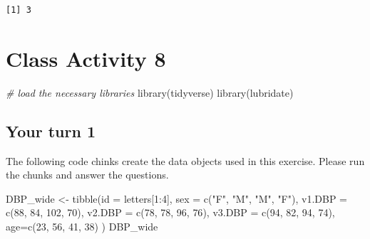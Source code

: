 \documentclass[
]{book}
\newenvironment{Shaded}{\begin{snugshade}}{\end{snugshade}}
\newcommand{\AttributeTok}[1]{\textcolor[rgb]{0.77,0.63,0.00}{#1}}
\newcommand{\CommentTok}[1]{\textcolor[rgb]{0.56,0.35,0.01}{\textit{#1}}}
\newcommand{\DecValTok}[1]{\textcolor[rgb]{0.00,0.00,0.81}{#1}}
\newcommand{\FunctionTok}[1]{\textcolor[rgb]{0.00,0.00,0.00}{#1}}
\newcommand{\NormalTok}[1]{#1}
\newcommand{\OtherTok}[1]{\textcolor[rgb]{0.56,0.35,0.01}{#1}}
\newcommand{\SpecialCharTok}[1]{\textcolor[rgb]{0.00,0.00,0.00}{#1}}
\newcommand{\StringTok}[1]{\textcolor[rgb]{0.31,0.60,0.02}{#1}}
\begin{document}
\begin{verbatim}
[1] 3
\end{verbatim}

\hypertarget{class-activity-8}{%
\chapter{Class Activity 8}\label{class-activity-8}}

\begin{Shaded}
\begin{Highlighting}[]
\CommentTok{\# load the necessary libraries}
\FunctionTok{library}\NormalTok{(tidyverse)}
\FunctionTok{library}\NormalTok{(lubridate)}
\end{Highlighting}
\end{Shaded}

\hypertarget{your-turn-1-1}{%
\section{Your turn 1}\label{your-turn-1-1}}

The following code chinks create the data objects used in this exercise. Please run the chunks and answer the questions.

\begin{Shaded}
\begin{Highlighting}[]
\NormalTok{DBP\_wide }\OtherTok{\textless{}{-}} \FunctionTok{tibble}\NormalTok{(}\AttributeTok{id =}\NormalTok{ letters[}\DecValTok{1}\SpecialCharTok{:}\DecValTok{4}\NormalTok{],}
 \AttributeTok{sex =} \FunctionTok{c}\NormalTok{(}\StringTok{"F"}\NormalTok{, }\StringTok{"M"}\NormalTok{, }\StringTok{"M"}\NormalTok{, }\StringTok{"F"}\NormalTok{),}
 \AttributeTok{v1.DBP =} \FunctionTok{c}\NormalTok{(}\DecValTok{88}\NormalTok{, }\DecValTok{84}\NormalTok{, }\DecValTok{102}\NormalTok{, }\DecValTok{70}\NormalTok{),}
 \AttributeTok{v2.DBP =} \FunctionTok{c}\NormalTok{(}\DecValTok{78}\NormalTok{, }\DecValTok{78}\NormalTok{, }\DecValTok{96}\NormalTok{, }\DecValTok{76}\NormalTok{),}
 \AttributeTok{v3.DBP =} \FunctionTok{c}\NormalTok{(}\DecValTok{94}\NormalTok{, }\DecValTok{82}\NormalTok{, }\DecValTok{94}\NormalTok{, }\DecValTok{74}\NormalTok{),}
 \AttributeTok{age=}\FunctionTok{c}\NormalTok{(}\DecValTok{23}\NormalTok{, }\DecValTok{56}\NormalTok{, }\DecValTok{41}\NormalTok{, }\DecValTok{38}\NormalTok{)}
\NormalTok{ )}
\NormalTok{DBP\_wide}
\end{Highlighting}
\end{Shaded}
\end{document}
